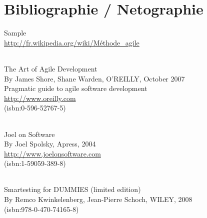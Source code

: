 \chapter{Bibliographie / Netographie}

Sample\\
\url{http://fr.wikipedia.org/wiki/Méthode_agile}\\

\subparagraph*{}
The Art of Agile Development \\
By James Shore, Shane Warden, O'REILLY, October 2007\\
Pragmatic guide to agile software development\\
\url{http://www.oreilly.com}\\
(isbn:0-596-52767-5)

\subparagraph*{}
Joel on Software\\
By Joel Spolsky, Apress, 2004\\
\url{http://www.joelonsoftware.com}\\
(isbn:1-59059-389-8)

\subparagraph*{}
Smartesting for DUMMIES (limited edition)\\
By Remco Kwinkelenberg, Jean-Pierre Schoch, WILEY, 2008\\
(isbn:978-0-470-74165-8)
